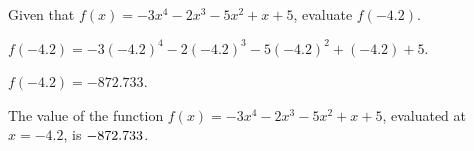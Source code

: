 \documentclass{ximera}
\begin{document}
\begin{shuffle}
\begin{exercise}
Given that $f(x)=-3 x^4-2 x^3-5 x^2+x+5$, evaluate $f(-4.2)$.
\begin{solution}
\begin{hint}
$f(-4.2)=-3 (-4.2)^4-2 (-4.2)^3-5 (-4.2)^2+(-4.2)+5$.
\end{hint}
\begin{hint}
$f(-4.2)=-872.733$.
\end{hint}
The value of the function $f(x) = -3 x^4-2 x^3-5 x^2+x+5$, evaluated at $x=-4.2$, is ${-872.733}$.
\end{solution}
\end{exercise}
\end{shuffle}
\end{document}
